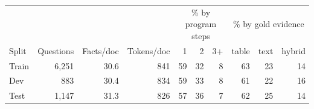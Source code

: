 \begin{tabular}{lrrrrrrrrr}
\toprule
 & & & & \multicolumn{3}{c}{\% by program steps} & \multicolumn{3}{c}{\% by gold evidence} \\
\cmidrule(lr){5-7}\cmidrule(lr){8-10}
Split & Questions & Facts/doc & Tokens/doc & 1 & 2 & 3+ & table & text & hybrid \\
\midrule
Train & 6,251 & 30.6 & 841 & 59 & 32 & 8 & 63 & 23 & 14 \\
Dev & 883 & 30.4 & 834 & 59 & 33 & 8 & 61 & 22 & 16 \\
Test & 1,147 & 31.3 & 826 & 57 & 36 & 7 & 62 & 25 & 14 \\
\bottomrule
\end{tabular}
